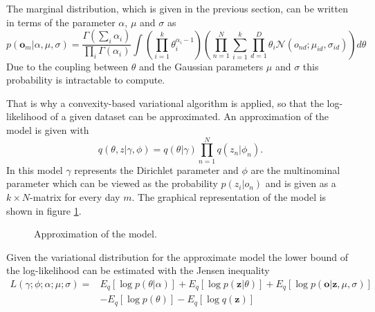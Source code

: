 The marginal distribution, which is given in the previous section, can be written in terms of the parameter $\alpha$, $\mu$ and $\sigma$ as
  \begin{equation}
   p(\textbf{o}_m|\alpha,\mu,\sigma) = \frac{\Gamma (\sum_i \alpha_i)}{\prod_i \Gamma(\alpha_i)} \int \left( \prod_{i=1}^k \theta_i^{\alpha_i-1} \right)
   \left( \prod_{n=1}^N \sum_{i=1}^k \prod_{d=1}^D \theta_i \mathcal{N}(o_{nd};\mu_{id},\sigma_{id} ) \right) d\theta
  \end{equation}
Due to the coupling between $\theta$ and the Gaussian parameters $\mu$ and $\sigma$ this probability is intractable to compute.	




That is why a convexity-based variational algorithm is applied, so that the log-likelihood of a given dataset can be approximated. 
An approximation of the model is given with 
  \begin{equation}
   q(\theta,z|\gamma,\phi) = q(\theta|\gamma) \prod_{n=1}^N q(z_n|\phi_n).
  \end{equation}
In this model $\gamma$ represents the Dirichlet parameter and $\phi$ are the multinominal parameter which can be viewed as the probability $p(z_i|o_n)$ and is given as a $k \times N$-matrix for every day $m$. The graphical representation of the model is shown in figure \ref{fig:ModelApprox}.
  
 
\begin{figure}[h!]
\centering
\def\svgwidth{0.4\textwidth}

\caption{Approximation of the model.}
\label{fig:ModelApprox}
\end{figure}
 
  
  
  
  Given the variational distribution for the approximate model the lower bound of the log-likelihood can be estimated with the Jensen inequality
  \begin{equation}
   \begin{split}
    L(\gamma;\phi;\alpha;\mu;\sigma) =& E_q[\log p(\theta|\alpha)] + E_q[\log p(\textbf{z}|\theta)] + E_q[\log p(\textbf{o}|\textbf{z},\mu,\sigma)] \\
   & -E_q[\log p(\theta)] - E_q[\log q(\textbf{z})]
   \end{split}
  \end{equation}

